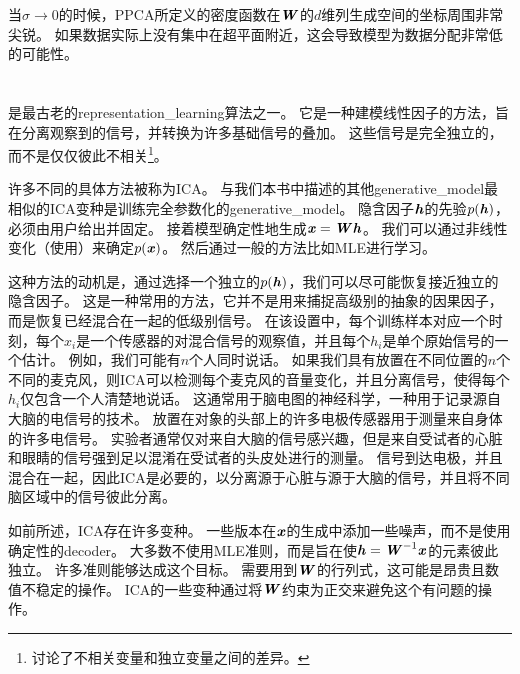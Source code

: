 当$\sigma\xrightarrow{} 0$的时候，\gls{PPCA}所定义的密度函数在$\boldsymbol{\mathit{W}}$的$d$维列生成空间的坐标周围非常尖锐。
如果数据实际上没有集中在超平面附近，这会导致模型为数据分配非常低的可能性。

\section{}
\label{sec:independent_component_analysis_ica}


是最古老的\gls{representation_learning}算法之一\citep{Herault+Ans-1984,Jutten+Herault-91,Comon94,Hyvarinen-1999,Hyvarinen-2001,Hinton-ICA-2001,Teh-2003}。
它是一种建模线性因子的方法，旨在分离观察到的信号，并转换为许多基础信号的叠加。
这些信号是完全独立的，而不是仅仅彼此不相关\footnote{讨论了不相关变量和独立变量之间的差异。}。


许多不同的具体方法被称为\gls{ICA}。
与我们本书中描述的其他\gls{generative_model}最相似的\gls{ICA}变种是训练完全参数化的\gls{generative_model}\citep{Pham-et-al-1992}。
隐含因子$\boldsymbol{\mathit{h}}$的先验$p(\boldsymbol{\mathit{h}})$，必须由用户给出并固定。
接着模型确定性地生成$\boldsymbol{\mathit{x}} = \boldsymbol{\mathit{W}} \boldsymbol{\mathit{h}}$。
我们可以通过非线性变化（使用）来确定$p(\boldsymbol{\mathit{x}})$。
然后通过一般的方法比如\gls{MLE}进行学习。


这种方法的动机是，通过选择一个独立的$p(\boldsymbol{\mathit{h}})$，我们可以尽可能恢复接近独立的隐含因子。
这是一种常用的方法，它并不是用来捕捉高级别的抽象的因果因子，而是恢复已经混合在一起的低级别信号。
在该设置中，每个训练样本对应一个时刻，每个$x_i$是一个传感器的对混合信号的观察值，并且每个$h_i$是单个原始信号的一个估计。
例如，我们可能有$n$个人同时说话。 
如果我们具有放置在不同位置的$n$个不同的麦克风，则\gls{ICA}可以检测每个麦克风的音量变化，并且分离信号，使得每个$h_i$仅包含一个人清楚地说话。
这通常用于脑电图的神经科学，一种用于记录源自大脑的电信号的技术。
放置在对象的头部上的许多电极传感器用于测量来自身体的许多电信号。
实验者通常仅对来自大脑的信号感兴趣，但是来自受试者的心脏和眼睛的信号强到足以混淆在受试者的头皮处进行的测量。
信号到达电极，并且混合在一起，因此\gls{ICA}是必要的，以分离源于心脏与源于大脑的信号，并且将不同脑区域中的信号彼此分离。


如前所述，\gls{ICA}存在许多变种。
一些版本在$\boldsymbol{\mathit{x}}$的生成中添加一些噪声，而不是使用确定性的\gls{decoder}。
大多数不使用\gls{MLE}准则，而是旨在使$\boldsymbol{\mathit{h}} = \boldsymbol{\mathit{W}}^{-1}\boldsymbol{\mathit{x}}$的元素彼此独立。
许多准则能够达成这个目标。
需要用到$\boldsymbol{\mathit{W}}$的行列式，这可能是昂贵且数值不稳定的操作。
\gls{ICA}的一些变种通过将$\boldsymbol{\mathit{W}}$约束为正交来避免这个有问题的操作。


